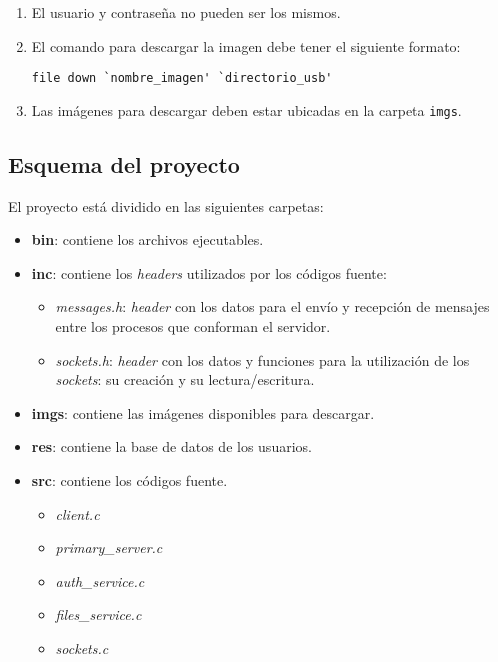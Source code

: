 \documentclass[12pt,a4paper]{article}
\begin{document}
\begin{enumerate}[leftmargin=1.5cm]
  \item El usuario y contraseña no pueden ser los mismos.
  \item El comando para descargar la imagen debe tener el
  siguiente formato:

  \begin{center}
    \verb|file down `nombre_imagen' `directorio_usb'|
  \end{center}

  \item Las imágenes para descargar deben estar ubicadas en la
  carpeta \verb|imgs|.
\end{enumerate}


\subsection{Esquema del proyecto}
\label{esq}

El proyecto está dividido en las siguientes carpetas:

\begin{itemize}[leftmargin=1.5cm]
  \item \textbf{bin}: contiene los archivos ejecutables.
  \item \textbf{inc}: contiene los \emph{headers} utilizados por los
  códigos fuente:

  \begin{itemize}[leftmargin=1cm, nosep]
    \item \emph{messages.h}: \emph{header} con los datos para el
    envío y recepción de mensajes entre los procesos que conforman
    el servidor.
    \item \emph{sockets.h}: \emph{header} con los datos y funciones
    para la utilización de los \emph{sockets}: su creación y su
    lectura/escritura.
  \end{itemize}

  \item \textbf{imgs}: contiene las imágenes disponibles para descargar.
  \item \textbf{res}: contiene la base de datos de los usuarios.
  \item \textbf{src}: contiene los códigos fuente.

  \begin{itemize}[leftmargin=1cm, nosep]
    \item \emph{client.c}
    \item \emph{primary\_server.c}
    \item \emph{auth\_service.c}
    \item \emph{files\_service.c}
    \item \emph{sockets.c}
  \end{itemize}

\end{itemize}
\end{document}
